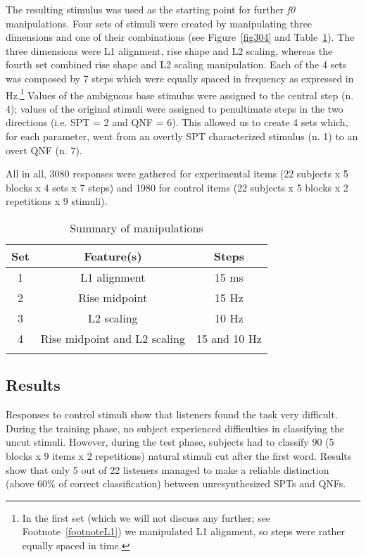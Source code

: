 The resulting stimulus was used as the starting point for further \textit{f0} manipulations. Four sets of stimuli were created by manipulating three dimensions and one of their combinations (see Figure~\ref{fig304} and Table~\ref{tab31}). The three dimensions were L1 alignment, rise shape and L2 scaling, whereas the fourth set combined rise shape and L2 scaling manipulation. Each of the 4 sets was composed by 7 steps which were equally spaced in frequency as expressed in Hz.\footnote{In the first set (which we will not discuss any further; see Footnote~\ref{footnoteL1}) we manipulated L1 alignment, so steps were rather equally spaced in time.} Values of the ambiguous base stimulus were assigned to the central step (n. 4); values of the original stimuli were assigned to penultimate steps in the two directions (i.e. SPT = 2 and QNF = 6). This allowed us to create 4 sets which, for each parameter, went from an overtly SPT characterized stimulus (n. 1) to an overt QNF (n. 7). 


All in all, 3080 responses were gathered for experimental items (22 subjects x 5 blocks x 4 sets x 7 steps) and 1980 for control items (22 subjects x 5 blocks x 2 repetitions x 9 stimuli).


\begin{table}[t]
\centering
\begin{tabular}{c c c}
\mytoprule
Set & Feature(s) & Steps \\
\midrule
1 & L1 alignment & 15 ms \\
2 & Rise midpoint & 15 Hz \\
3 & L2 scaling & 10 Hz \\
4 & Rise midpoint and L2 scaling & 15 and 10 Hz \\
\mybottomrule
\end{tabular}
\caption{Summary of manipulations}
\label{tab31}\end{table}


\subsection{Results}\label{sec322}
Responses to control stimuli show that listeners found the task very difficult. During the training phase, no subject experienced difficulties in classifying the uncut stimuli. However, during the test phase, subjects had to classify 90 (5 blocks x 9 items x 2 repetitions) natural stimuli cut after the first word. Results show that only 5 out of 22 listeners managed to make a reliable distinction (above 60\% of correct classification) between unresynthesized SPTs and QNFs.

